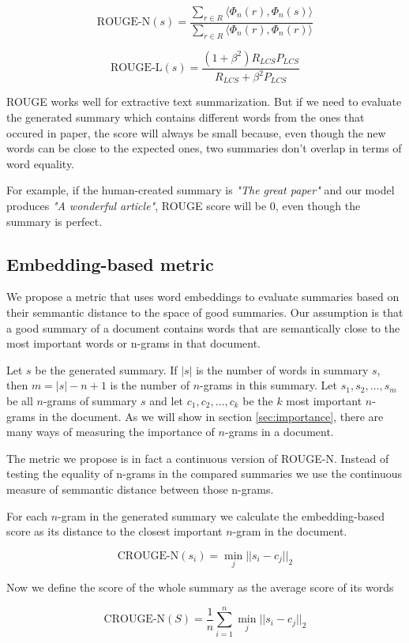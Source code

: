 \documentclass[sigplan]{acmart}
\begin{document}
\[ \text{ROUGE-N}(s) = \frac{\sum_{r \in R} \langle \Phi_n(r), \Phi_n(s) \rangle}{\sum_{r \in R} \langle \Phi_n(r), \Phi_n(r) \rangle} \]

\[ \text{ROUGE-L}(s) = \frac{(1 + \beta^2) R_{LCS} P_{LCS}}{R_{LCS} + \beta^2 P_{LCS}} \]

ROUGE works well for extractive text summarization. But if we need to evaluate the generated summary which contains different words from the ones that occured in paper, the score will always be small because, even though the new words can be close to the expected ones, two summaries don't overlap in terms of word equality.

For example, if the human-created summary is \textit{"The great paper"} and our model produces \textit{"A wonderful article"}, ROUGE score will be $0$, even though the summary is perfect.

\subsection{Embedding-based metric}

We propose a metric that uses word embeddings to evaluate summaries based on their semmantic distance to the space of good summaries. Our assumption is that a good summary of a document contains words that are semantically close to the most important words or n-grams in that document.

Let $s$ be the generated summary. If $|s|$ is the number of words in summary $s$, then $m=|s|-n+1$ is the number of $n$-grams in this summary. Let $s_1, s_2, \dots, s_m$ be all $n$-grams of summary $s$ and let $c_1, c_2, \dots, c_k$ be the $k$ most important $n$-grams in the document. As we will show in section \ref{sec:importance}, there are many ways of measuring the importance of $n$-grams in a document.

The metric we propose is in fact a continuous version of ROUGE-N. Instead of testing the equality of n-grams in the compared summaries we use the continuous measure of semmantic distance between those n-grams.

For each $n$-gram in the generated summary we calculate the embedding-based score as its distance to the closest important $n$-gram in the document.

\[ \text{CROUGE-N}(s_i) = \operatorname*{min}_j ||s_i - c_j||_2 \]

Now we define the score of the whole summary as the average score of its words

\[ \text{CROUGE-N}(S) = \frac1n \sum_{i=1}^n \operatorname*{min}_j ||s_i - c_j||_2 \]
\end{document}
